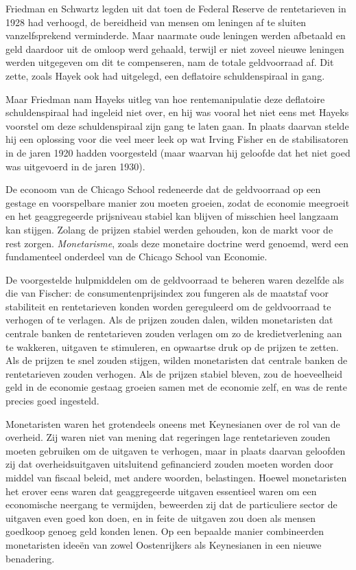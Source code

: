 \documentclass[smalldemyvopaper,11pt,twoside,onecolumn,openright,extrafontsizes,hidelinks]{memoir}
\begin{document}
Friedman en Schwartz legden uit dat toen de Federal Reserve de
rentetarieven in 1928 had verhoogd, de bereidheid van mensen om leningen
af te sluiten vanzelfsprekend verminderde. Maar naarmate oude leningen
werden afbetaald en geld daardoor uit de omloop werd gehaald, terwijl er
niet zoveel nieuwe leningen werden uitgegeven om dit te compenseren, nam
de totale geldvoorraad af. Dit zette, zoals Hayek ook had uitgelegd, een
deflatoire schuldenspiraal in gang.

Maar Friedman nam Hayeks uitleg van hoe rentemanipulatie deze deflatoire
schuldenspiraal had ingeleid niet over, en hij was vooral het niet eens
met Hayeks voorstel om deze schuldenspiraal zijn gang te laten gaan. In
plaats daarvan stelde hij een oplossing voor die veel meer leek op wat
Irving Fisher en de stabilisatoren in de jaren 1920 hadden voorgesteld
(maar waarvan hij geloofde dat het niet goed was uitgevoerd in de jaren
1930).

De econoom van de Chicago School redeneerde dat de geldvoorraad op een
gestage en voorspelbare manier zou moeten groeien, zodat de economie
meegroeit en het geaggregeerde prijsniveau stabiel kan blijven of
misschien heel langzaam kan stijgen. Zolang de prijzen stabiel werden
gehouden, kon de markt voor de rest zorgen. \emph{Monetarisme}, zoals
deze monetaire doctrine werd genoemd, werd een fundamenteel onderdeel
van de Chicago School van Economie.

De voorgestelde hulpmiddelen om de geldvoorraad te beheren waren
dezelfde als die van Fischer: de consumentenprijsindex zou fungeren als
de maatstaf voor stabiliteit en rentetarieven konden worden gereguleerd
om de geldvoorraad te verhogen of te verlagen. Als de prijzen zouden
dalen, wilden monetaristen dat centrale banken de rentetarieven zouden
verlagen om zo de kredietverlening aan te wakkeren, uitgaven te
stimuleren, en opwaartse druk op de prijzen te zetten. Als de prijzen te
snel zouden stijgen, wilden monetaristen dat centrale banken de
rentetarieven zouden verhogen. Als de prijzen stabiel bleven, zou de
hoeveelheid geld in de economie gestaag groeien samen met de economie
zelf, en was de rente precies goed ingesteld.

Monetaristen waren het grotendeels oneens met Keynesianen over de rol
van de overheid. Zij waren niet van mening dat regeringen lage
rentetarieven zouden moeten gebruiken om de uitgaven te verhogen, maar
in plaats daarvan geloofden zij dat overheidsuitgaven uitsluitend
gefinancierd zouden moeten worden door middel van fiscaal beleid, met
andere woorden, belastingen. Hoewel monetaristen het erover eens waren
dat geaggregeerde uitgaven essentieel waren om een economische neergang
te vermijden, beweerden zij dat de particuliere sector de uitgaven even
goed kon doen, en in feite de uitgaven zou doen als mensen goedkoop
genoeg geld konden lenen. Op een bepaalde manier combineerden
monetaristen ideeën van zowel Oostenrijkers als Keynesianen in een
nieuwe benadering.
\end{document}
